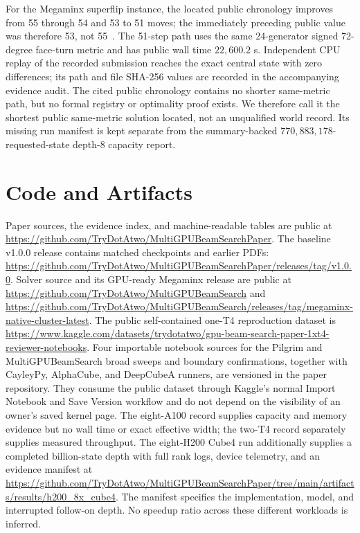 \documentclass[10pt,twocolumn]{article}
\begin{document}
For the Megaminx superflip instance, the located public chronology improves
from 55 through 54 and 53 to 51 moves; the immediately preceding public value
was therefore 53, not 55~\cite{megaminxsuperflip53,megaminxsuperflip51}.  The
51-step path uses the same 24-generator signed 72-degree face-turn metric and
has public wall time $22{,}600.2$ s.  Independent CPU replay of the recorded
submission reaches the exact central state with zero differences; its path
and file SHA-256 values are recorded in the accompanying evidence audit.
The cited public chronology contains no shorter same-metric path, but no
formal registry or optimality proof exists.  We therefore call it the shortest
public same-metric solution located, not an unqualified world record.  Its
missing run manifest is kept separate from the summary-backed
$770{,}883{,}178$-requested-state depth-8 capacity report.

\section{Code and Artifacts}
Paper sources, the evidence index, and machine-readable tables are public at
\url{https://github.com/TryDotAtwo/MultiGPUBeamSearchPaper}.  The baseline
v1.0.0 release contains matched checkpoints and earlier PDFs:
\url{https://github.com/TryDotAtwo/MultiGPUBeamSearchPaper/releases/tag/v1.0.0}.
Solver source and its GPU-ready Megaminx release are public at
\url{https://github.com/TryDotAtwo/MultiGPUBeamSearch} and
\url{https://github.com/TryDotAtwo/MultiGPUBeamSearch/releases/tag/megaminx-native-cluster-latest}.
The public self-contained one-T4 reproduction dataset is
\url{https://www.kaggle.com/datasets/trydotatwo/gpu-beam-search-paper-1xt4-reviewer-notebooks}.
Four importable notebook sources for the Pilgrim and MultiGPUBeamSearch broad
sweeps and boundary confirmations, together with CayleyPy, AlphaCube, and
DeepCubeA runners, are versioned in the paper repository.  They consume the
public dataset through Kaggle's normal Import Notebook and Save Version
workflow and do not depend on the visibility of an owner's saved kernel page.
The eight-A100 record supplies capacity and memory evidence but no wall time or
exact effective width; the two-T4 record separately supplies measured
throughput. The eight-H200 Cube4 run additionally supplies a completed
billion-state depth with full rank logs, device telemetry, and an evidence
manifest at
\url{https://github.com/TryDotAtwo/MultiGPUBeamSearchPaper/tree/main/artifacts/results/h200_8x_cube4}.
The manifest specifies the implementation, model, and interrupted follow-on
depth. No speedup ratio across these different workloads is inferred.
\end{document}
